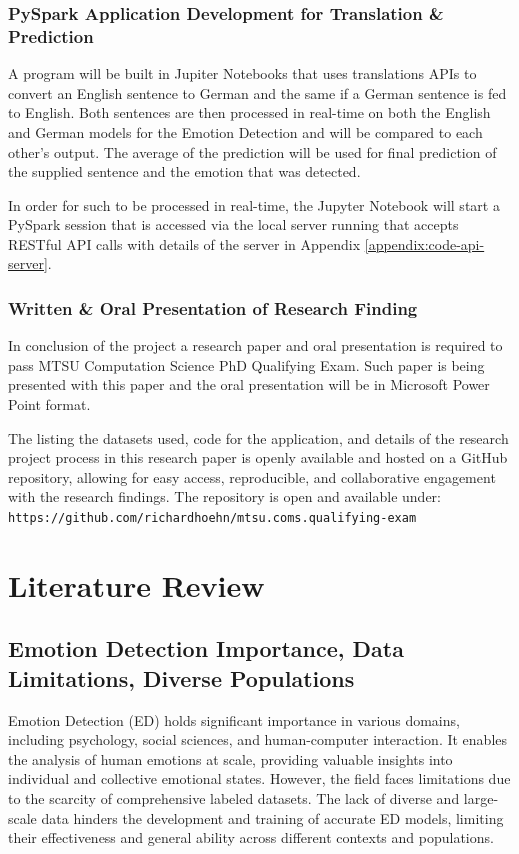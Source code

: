 \documentclass[11pt]{article}
\begin{document}
\subsubsection{PySpark Application Development for Translation \& Prediction}
A program will be built in Jupiter Notebooks that uses translations APIs to convert an English sentence to German and the same if a German sentence is fed to English. Both sentences are then processed in real-time on both the English and German models for the Emotion Detection and will be compared to each other's output. The average of the prediction will be used for final prediction of the supplied sentence and the emotion that was detected.

In order for such to be processed in real-time, the Jupyter Notebook will start a PySpark session that is accessed via the local server running that accepts RESTful API calls with details of the server in Appendix \ref{appendix:code-api-server}.

\subsubsection{Written \& Oral Presentation of Research Finding}
In conclusion of the project a research paper and oral presentation is required to pass MTSU Computation Science PhD Qualifying Exam. Such paper is being presented with this paper and the oral presentation will be in Microsoft Power Point format.

The listing the datasets used, code for the application, and details of the research project process in this research paper is openly available and hosted on a GitHub repository, allowing for easy access, reproducible, and collaborative engagement with the research findings. The repository is open and available under: \texttt{https://github.com/richardhoehn/mtsu.coms.qualifying-exam}\cite{Hoehn_Improving_Emotion_Detection_2023}

\section{Literature Review}

\subsection{Emotion Detection Importance, Data Limitations, Diverse Populations}
Emotion Detection (ED) holds significant importance in various domains, including psychology, social sciences, and human-computer interaction. It enables the analysis of human emotions at scale, providing valuable insights into individual and collective emotional states. However, the field faces limitations due to the scarcity of comprehensive labeled datasets. The lack of diverse and large-scale data hinders the development and training of accurate ED models, limiting their effectiveness and general ability across different contexts and populations.
\end{document}
